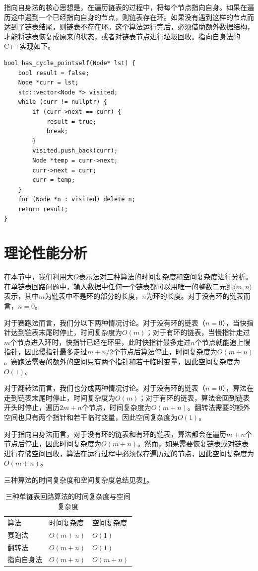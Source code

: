 \documentclass[UTF8]{ctexart}
\begin{document}
指向自身法的核心思想是，在遍历链表的过程中，将每个节点指向自身。如果在遍历途中遇到一个已经指向自身的节点，则链表存在环。如果没有遇到这样的节点而达到了链表结尾，则链表不存在环。这个算法运行完后，必须借助额外数据结构，才能将链表恢复成原来的状态，或者对链表节点进行垃圾回收。指向自身法的C++实现如下。

\begin{lstlisting}
bool has_cycle_pointself(Node* lst) {
    bool result = false;
    Node *curr = lst;
    std::vector<Node *> visited;
    while (curr != nullptr) {
        if (curr->next == curr) {
            result = true;
            break;
        }
        visited.push_back(curr);
        Node *temp = curr->next;
        curr->next = curr;
        curr = temp;
    }
    for (Node *n : visited) delete n;
    return result;
}
\end{lstlisting}

\section{理论性能分析}

在本节中，我们利用大$O$表示法对三种算法的时间复杂度和空间复杂度进行分析。在单链表回路问题中，输入数据中任何一个链表都可以用唯一的整数二元组$\langle m, n \rangle$表示，其中$m$为链表中不是环的部分的长度，$n$为环的长度。对于没有环的链表而言，$n=0$。

对于赛跑法而言，我们分以下两种情况讨论。对于没有环的链表（$n=0$），当快指针达到链表末尾时停止，时间复杂度为$O(m)$；对于有环的链表，当慢指针走过$m$个节点进入环时，快指针已经在环里，此时快指针最多走过$n$个节点就能追上慢指针，因此慢指针最多走过$m+n/2$个节点后算法停止，时间复杂度为$O(m+n)$。赛跑法需要的额外的空间只有两个指针和若干临时变量，因此空间复杂度为$O(1)$。

对于翻转法而言，我们也分成两种情况讨论。对于没有环的链表（$n=0$），算法在走到链表末尾时停止，时间复杂度为$O(m)$；对于有环的链表，算法会回到链表开头时停止，遍历$2m+n$个节点，时间复杂度为$O(m+n)$。翻转法需要的额外空间也只有两个指针和若干临时变量，因此空间复杂度为$O(1)$。

对于指向自身法而言，对于没有环的链表和有环的链表，算法都会在遍历$m+n$个节点后停止，因此时间复杂度为$O(m+n)$。然而，如果需要恢复链表或对链表进行存储空间回收，算法在运行过程中必须保存遍历过的节点，因此空间复杂度为$O(m+n)$。

三种算法的时间复杂度和空间复杂度总结见表\ref{tab:complexity}。

\begin{table}
\centering
\begin{tabular}{lll}
 算法 & 时间复杂度 & 空间复杂度 \\ 
\hhline{===}
赛跑法 & $O(m+n)$ & $O(1)$  \\ 
\hline
翻转法 & $O(m+n)$ & $O(1)$  \\ 
\hline
指向自身法 & $O(m+n)$ & $O(m+n)$
\end{tabular}
\caption{三种单链表回路算法的时间复杂度与空间复杂度}
\label{tab:complexity}
\end{table}
\end{document}
